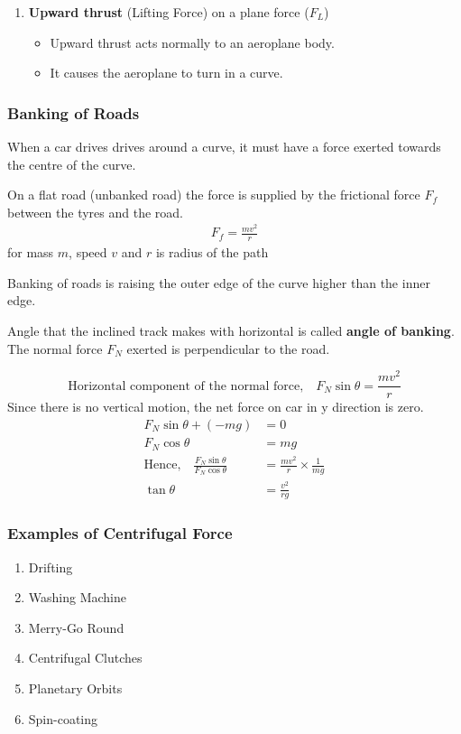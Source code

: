\begin{enumerate}
		\begin{itemize}
			\item For example, when a car moves in a circle path
				which  is inclined to the horizontal (banked),
				the reaction force of the road acts \textbf{normally} to the car.
			\item 2 components: horizontal component acts towards the centre of the circle.
		\end{itemize}
	\item \textbf{Upward thrust} (Lifting Force) on a plane force ($F_L$)
		\begin{itemize}
			\item Upward thrust acts normally to an aeroplane body.
			\item It causes the aeroplane to turn in a curve.
		\end{itemize}
\end{enumerate}


\subsubsection*{Banking of Roads}
When a car drives drives around a curve,
it must have a force exerted towards the centre of the curve.

On a flat road (unbanked road) the force is supplied
by the frictional force $F_f$ between the tyres and the road.
\begin{align}
	F_f = \frac{mv^2}{r}
\end{align}
for mass $m$, speed $v$ and $r$ is radius of the path
\bigskip

Banking of roads is raising the outer edge of the curve
higher than the inner edge.

Angle that the inclined track makes with horizontal
is called \textbf{angle of banking}.
The normal force $F_N$ exerted is perpendicular to the road.

\begin{equation}
	\text{Horizontal component of the normal force,}\quad
	F_N\sin\theta = \frac{mv^2}{r}
\end{equation}
Since there is no vertical motion, the net force on car in y direction is zero.
\begin{align}
	F_N\sin\theta + (-mg) &= 0 \\
	F_N\cos\theta &= mg \\
	\text{Hence,} \quad
	\frac{F_N\sin\theta}{F_N\cos\theta} &=
	\frac{mv^2}{r} \times \frac{1}{mg} \\
	\tan\theta &= \frac{v^2}{rg}
\end{align}

\subsubsection*{Examples of Centrifugal Force}
\begin{enumerate}[label=(\arabic*)]
	\item Drifting
	\item Washing Machine
	\item Merry-Go Round
	\item Centrifugal Clutches
	\item Planetary Orbits
	\item Spin-coating
\end{enumerate}
